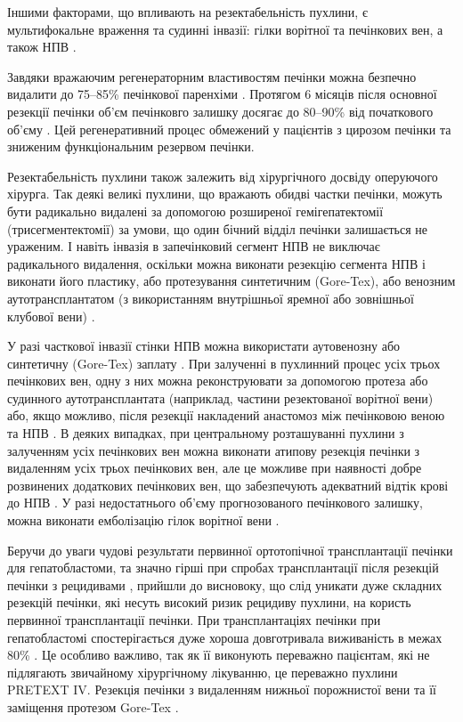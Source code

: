 Іншими факторами, що впливають на резектабельність пухлини, є мультифокальне враження та судинні інвазії: гілки ворітної та печінкових вен, а також НПВ \cite{pmid29761829}.

Завдяки вражаючим регенераторним властивостям печінки можна безпечно видалити до 75–85\% печінкової паренхіми \cite{pmid29888545}. Протягом 6 місяців після основної резекції печінки об’єм печінковго залишку досягає до 80–90\% від початкового об’єму \cite{pmid29906233}. Цей регенеративний процес обмежений у пацієнтів з цирозом печінки та зниженим функціональним резервом печінки. 

Резектабельність пухлини також залежить від хірургічного досвіду оперуючого хірурга. Так деякі великі пухлини, що вражають обидві частки печінки, можуть бути радикально видалені за допомогою розширеної гемігепатектомії (трисегментектомії) за умови, що один бічний відділ печінки залишається не ураженим. І навіть інвазія в запечінковий сегмент НПВ не виключає радикального видалення, оскільки можна виконати резекцію сегмента НПВ і виконати його пластику, або протезування синтетичним (Gore-Tex), або венозним аутотрансплантатом (з використанням внутрішньої яремної або зовнішньої клубової вени) \cite{pmid29906299}.

У разі часткової інвазії стінки НПВ можна використати аутовенозну або синтетичну (Gore-Tex) заплату \cite{pmid30003622}. При залученні в пухлинний процес усіх трьох печінкових вен, одну з них можна реконструювати за допомогою протеза або судинного аутотрансплантата (наприклад, частини резектованої ворітної вени) або, якщо можливо, після резекції накладений анастомоз між печінковою веною та НПВ \cite{pmid30084209}. В деяких випадках, при центральному розташуванні пухлини з залученням усіх печінкових вен можна виконати атипову резекція печінки з видаленням усіх трьох печінкових вен, але це можливе при наявності добре розвинених додаткових печінкових вен, що забезпечують адекватний відтік крові до НПВ \cite{pmid30086577}. У разі недостатнього об’єму прогнозованого печінкового залишку, можна виконати  емболізацію гілок ворітної вени \cite{pmid30270490}.

Беручи до уваги чудові результати первинної ортотопічної трансплантації печінки для гепатобластоми, та значно гірші при спробах трансплантації після резекцій печінки з рецидивами \cite{pmid30528797}, прийшли до висновоку, що слід уникати дуже складних резекцій печінки, які несуть високий ризик рецидиву пухлини, на користь первинної трансплантації печінки. При трансплантаціях печінки при гепатобластомі спостерігається дуже хороша довготривала виживаність в межах 80\% \cite{pmid30577683}. Це особливо важливо, так як її виконують переважно пацієнтам, які не підлягають звичайному хірургічному лікуванню, це переважно пухлини PRETEXT IV. Резекція печінки з видаленням нижньої порожнистої вени та її заміщення протезом Gore-Tex \cite{pmid30762666}.

